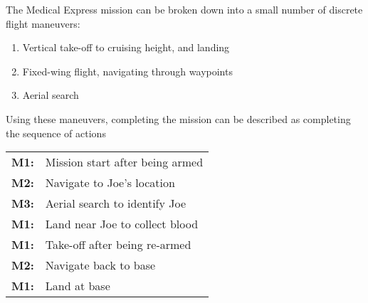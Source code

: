 The Medical Express mission can be broken down into a small number of discrete flight maneuvers:
\begin{enumerate}[label=\bfseries M\arabic*:] \itemsep-2pt
	\item Vertical take-off to cruising height, and landing
	\item Fixed-wing flight, navigating through waypoints
	\item Aerial search
\end{enumerate}

Using these maneuvers, completing the mission can be described as completing the sequence of actions\\
\begin{tabular}[!ht]{r l}
	\textbf{M1:} & Mission start after being armed\\
	\textbf{M2:} & Navigate to Joe's location\\
	\textbf{M3:} & Aerial search to identify Joe\\
	\textbf{M1:} & Land near Joe to collect blood\\
	\textbf{M1:} & Take-off after being re-armed\\
	\textbf{M2:} & Navigate back to base\\
	\textbf{M1:} & Land at base
\end{tabular}